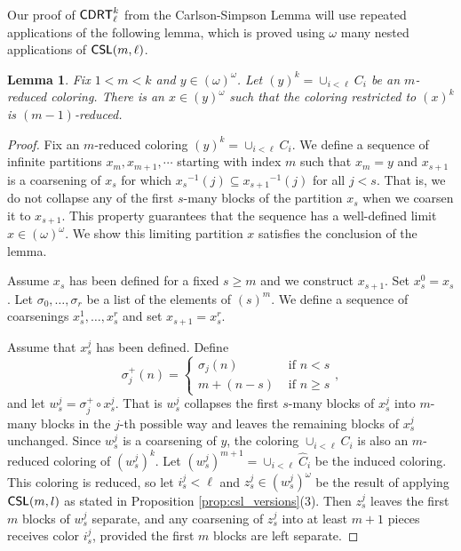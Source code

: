 \documentclass{amsart}
\newtheorem{lem}[thm]{Lemma}
\theoremstyle{definition}
\theoremstyle{remark}
\newcommand{\system}[1]{\mbox{\fontfamily{cmss}\fontshape{n}\fontseries{m}%
    \selectfont#1}}
\newcommand{\CDRT}{\system{CDRT}}
\newcommand{\CSL}{\system{CSL}}
\newcommand{\block}[2]{{#1}^{-1}(#2)}
\begin{document}
Our proof of $\CDRT^k_\ell$ from the Carlson-Simpson Lemma will use repeated applications of the following lemma, which is proved using $\omega$ many nested 
applications of $\CSL(m,\ell)$. 

\begin{lem}\label{lem:2.10}
Fix $1<m<k$ and $y \in (\omega)^\omega$.  Let $(y)^k = \cup_{i < \ell} C_i$ be an 
$m$-reduced coloring.  There is an $x \in (y)^\omega$ such
that the coloring restricted to $(x)^k$ is $(m-1)$-reduced.
\end{lem}

\begin{proof}
Fix an $m$-reduced coloring $(y)^{k} = \cup_{i < \ell} C_i$. We define a sequence of infinite partitions $x_m, x_{m+1}, \cdots$ starting with index $m$ 
such that $x_m = y$ and $x_{s+1}$ is a coarsening of $x_s$ for which $\block{x_s}{j} \subseteq \block{x_{s+1}}{j}$ for all $j < s$. 
That is, we do not collapse any of the first $s$-many blocks of the partition $x_s$ when we coarsen it to $x_{s+1}$. This property guarantees that 
the sequence has a well-defined limit $x \in (\omega)^{\omega}$. We show this limiting partition $x$ satisfies the conclusion of the lemma. 

Assume $x_s$ has been defined for a fixed $s \geq m$ and we construct $x_{s+1}$. 
Set $x_s^0 = x_s$. Let $\sigma_0,\dots,\sigma_r$ be a list of the elements of 
$(s)^m$.  We define a sequence of coarsenings $x_s^1, \ldots, x_s^r$ and set $x_{s+1} = x_s^r$. 

Assume that $x_s^j$ has been defined.  Define
$$\sigma_j^+(n) = \begin{cases} \sigma_j(n) & \text{ if } n < s \\ m + (n-s) & \text{ if } n \geq s\end{cases},$$
and let $w_s^j = \sigma_j^+ \circ x_s^j$.  That is $w_s^j$ collapses 
the first $s$-many blocks of $x_s^j$ into 
$m$-many blocks in the $j$-th possible way and leaves the remaining blocks of 
$x_s^j$ unchanged. Since $w_s^j$ is a coarsening of $y$, the coloring 
$\cup_{i < \ell} C_i$ is also an $m$-reduced coloring of $(w_s^j)^k$.
Let $(w_s^j)^{m+1} = \cup_{i<\ell} \widehat C_i$
be the induced coloring.  This coloring is reduced, so
let $i_s^j<\ell$ and $z_s^j \in (w_s^j)^\omega$ 
be the result of applying $\CSL(m,l)$ as stated in 
Proposition \ref{prop:csl_versions}(3).  Then $z_s^j$ 
leaves the first $m$ blocks of $w_s^j$ separate, 
and any coarsening of $z_s^j$ into at least $m+1$ pieces
receives color $i_s^j$, provided the first $m$ blocks 
are left separate.



\end{proof}
\end{document}
